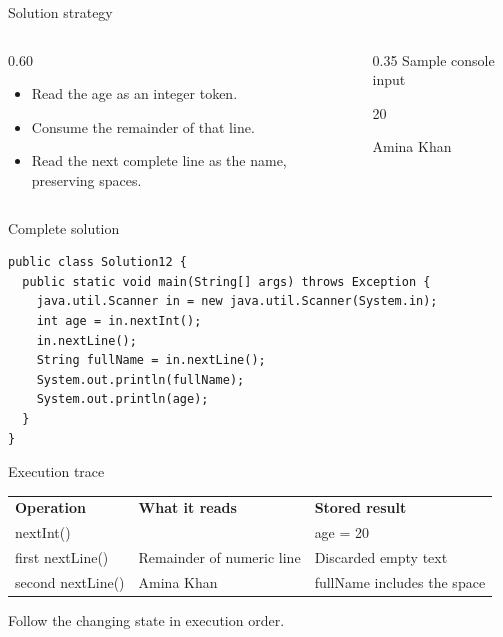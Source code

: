 \documentclass[10pt,aspectratio=169]{beamer}
\begin{document}
\begin{frame}[fragile,t]{Solution strategy}
\begin{columns}[T,onlytextwidth]\begin{column}{0.60\textwidth}
\begin{itemize}
\item Read the age as an integer token.
\item Consume the remainder of that line.
\item Read the next complete line as the name, preserving spaces.
\end{itemize}
\end{column}\begin{column}{0.35\textwidth}\small
Sample console input\par 20\par Amina Khan\par 
\end{column}\end{columns}
\end{frame}

\begin{frame}[fragile,t]{Complete solution}
\begin{lstlisting}
public class Solution12 {
  public static void main(String[] args) throws Exception {
    java.util.Scanner in = new java.util.Scanner(System.in);
    int age = in.nextInt();
    in.nextLine();
    String fullName = in.nextLine();
    System.out.println(fullName);
    System.out.println(age);
  }
}
\end{lstlisting}
\end{frame}

\begin{frame}[fragile,t]{Execution trace}
\small\renewcommand{\arraystretch}{1.5}
\begin{tabularx}{\textwidth}{>{\raggedright\arraybackslash}X>{\raggedright\arraybackslash}X>{\raggedright\arraybackslash}X}
\rowcolor{navy}
\color{white}\bfseries Operation & \color{white}\bfseries What it reads & \color{white}\bfseries Stored result\\
nextInt() & 20 & age = 20\\
first nextLine() & Remainder of numeric line & Discarded empty text\\
second nextLine() & Amina Khan & fullName includes the space\\
\end{tabularx}
\vspace{3mm}\footnotesize Follow the changing state in execution order.
\end{frame}
\end{document}
